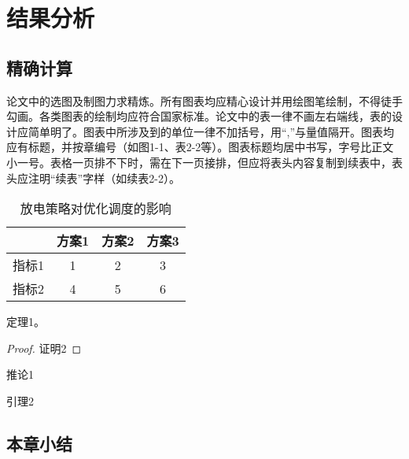 \chapter{结果分析}
\section{精确计算}

论文中的选图及制图力求精炼。所有图表均应精心设计并用绘图笔绘制，不得徒手勾画。各类图表的绘制均应符合国家标准。论文中的表一律不画左右端线，表的设计应简单明了。图表中所涉及到的单位一律不加括号，用“,”与量值隔开。图表均应有标题，并按章编号（如图1-1、表2-2等）。图表标题均居中书写，字号比正文小一号。表格一页排不下时，需在下一页接排，但应将表头内容复制到续表中，表头应注明“续表”字样（如续表2-2）。
\begin{table}[h]
\caption{放电策略对优化调度的影响}
\begin{tabular}{cccc}
    \toprule
          & 方案1   & 方案2   & 方案3 \\
    \midrule
    指标1   & 1     & 2     & 3 \\
    指标2   & 4     & 5     & 6 \\
    \bottomrule
    \end{tabular}%
\label{tablea}
\end{table}


\begin{figure}[h]
\label{fig2}
\end{figure}

\begin{theorem}
定理1。
\end{theorem}
\begin{proof}
证明2
\end{proof}
\begin{corollary}
推论1
\end{corollary}
\begin{lemma}
引理2
\end{lemma}

\section{本章小结}
